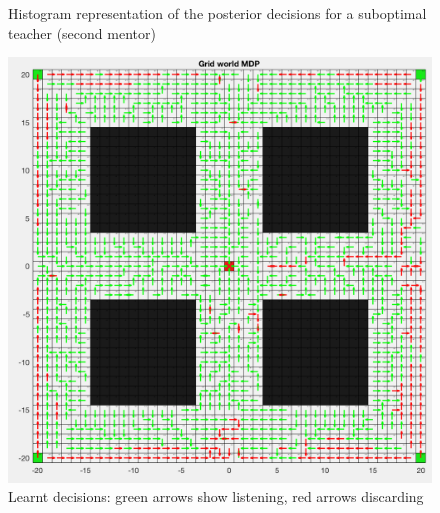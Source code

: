 \documentclass[a4paper]{report}
\begin{document}
{{{{\begin{figure}[ht!]
\begin{minipage}{0.45\linewidth}
\begin{center}
							\caption{Histogram representation of the posterior decisions for a suboptimal teacher (second mentor)}
							\label{fig::post_des_50}
						\end{center}
					\end{minipage}
				\end{figure}
				
				
				\begin{figure}[ht!]
					\begin{minipage}{0.5\linewidth}
						\begin{center}
							\includegraphics[width=0.9\linewidth]{heatmap_decision_120}
							\caption{Learnt decisions: green arrows show listening, red arrows discarding}
							\label{fig::heatmap_des_120}
						\end{center}
					\end{minipage}
					\hfill
					\begin{minipage}{0.5\linewidth}
						\begin{center}

\end{center}
\end{minipage}
\end{figure}}}}}
\end{document}
